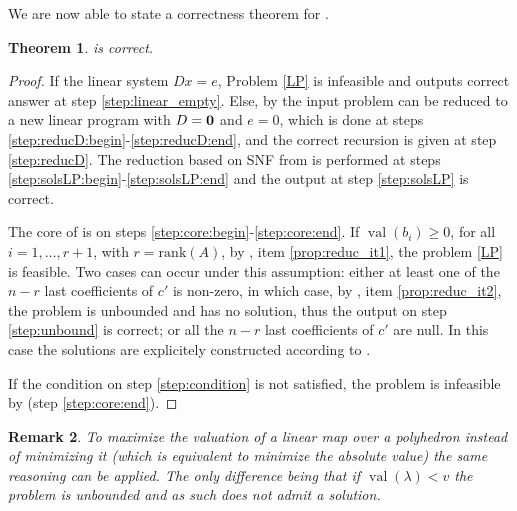 \documentclass[a4paper,oneside,10pt]{article}
\newtheorem{theorem}{Theorem}[section]
\newtheorem{remark}[theorem]{Remark}
\DeclareMathOperator{\val}{val}
\begin{document}
We are now able to state a correctness theorem for .
  
\begin{theorem}  is correct.
\end{theorem}
\begin{proof}
  If the linear system $Dx=e$, Problem \eqref{LP} is infeasible
  and  outputs correct answer at step \ref{step:linear_empty}.
  Else, by  the input problem can be reduced to a new linear
  program with $D={\bf 0}$ and $e=0$, which is done at steps
  \ref{step:reducD:begin}-\ref{step:reducD:end},
  and the correct recursion is given at step \ref{step:reducD}.
  The reduction based on SNF from  is performed at
  steps \ref{step:solsLP:begin}-\ref{step:solsLP:end} and the output
  at step \ref{step:solsLP} is correct.
  
  The core of  is on steps \ref{step:core:begin}-\ref{step:core:end}.
  If $\val(b_i) \geq 0$, for all $i=1,\ldots,r+1$, with $r = \mathrm{rank}(A)$,
  by , item \ref{prop:reduc_it1}, the problem \eqref{LP} is feasible.
  Two cases can occur under this assumption:
  either at least one of the $n-r$ last coefficients of $c'$ is non-zero,
  in which case,
  by , item \ref{prop:reduc_it2}, the problem is
  unbounded and has no solution, thus the output on step \ref{step:unbound} is correct;
  or all the $n-r$ last coefficients of $c'$ are null. In this case the solutions
  are explicitely constructed according to .

  If the condition on step \ref{step:condition} is not satisfied, the problem
  is infeasible by  (step \ref{step:core:end}).
\end{proof}


\begin{remark}
  To maximize the valuation of a linear map over a polyhedron instead of minimizing it 
  (which is equivalent to minimize the absolute value) the same reasoning can be applied. 
  The only difference being that if $\val\left( \lambda\right) < v$ the problem is unbounded
  and as such does not admit a solution. 
\end{remark}
\end{document}
